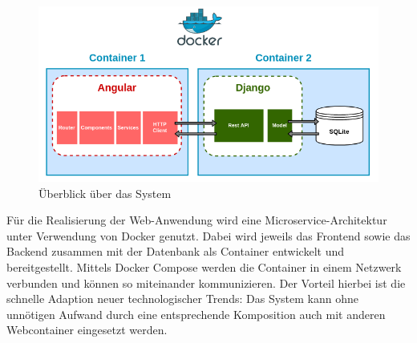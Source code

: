 \documentclass[conference]{IEEEtran}
\begin{document}
\begin{figure}[!h]
	\centering
	\includegraphics[width=\columnwidth]{./figures/architecture_with_docker}
	\caption{Überblick über das System}
\end{figure}
Für die Realisierung der Web-Anwendung wird eine Microservice-Architektur unter Verwendung von Docker genutzt. Dabei wird jeweils das Frontend sowie das Backend zusammen mit der Datenbank als Container entwickelt und bereitgestellt. Mittels Docker Compose werden die Container in einem Netzwerk verbunden und können so miteinander kommunizieren. Der Vorteil hierbei ist die schnelle Adaption neuer technologischer Trends: Das System kann ohne unnötigen Aufwand durch eine entsprechende Komposition auch mit anderen Webcontainer eingesetzt werden.
\pagebreak
\end{document}
